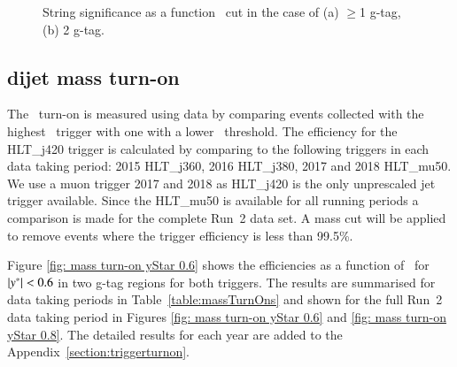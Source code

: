 \begin{figure}[htbp]
        \centering
        \caption{String significance as a function \ystar\ cut in the case of (a) $\geq$1 g-tag, (b) 2 g-tag.}
        \label{fig: string significance as a function of y* cut}
\end{figure}




\subsection{dijet mass turn-on}
\label{section:dijetmassturn-on} %


The \mjj\ turn-on is measured using data by comparing events collected with the highest \pT\ 
trigger with one with a lower \pt\ threshold.  The efficiency for the HLT\_j420 trigger is calculated by comparing to the 
following triggers in each data taking period: 2015 HLT\_j360, 2016 HLT\_j380, 2017 and 2018 HLT\_mu50. We use a muon trigger 
2017 and 2018 as HLT\_j420 is the only unprescaled jet trigger available. Since the HLT\_mu50 is available for all running periods 
a comparison is made for the complete Run~2 data set. 
A mass cut will be applied to remove events where 
the trigger efficiency is less than 99.5\%.

Figure \ref{fig: mass turn-on yStar 0.6} shows the efficiencies as a function of \mjj\ for $|y^\ast|<0.6$ in 
two g-tag regions for both triggers.  The results 
are summarised for data taking periods in Table~\ref{table:massTurnOns} and shown for the full Run~2 data 
taking period in Figures \ref{fig: mass turn-on yStar 0.6} and \ref{fig: mass turn-on yStar 0.8}. The detailed results for
each year are added to the Appendix~\ref{section:triggerturnon}.


